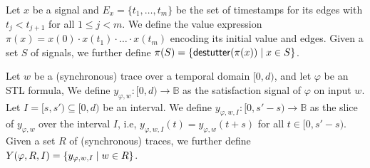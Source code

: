 \documentclass[iicol,lineno]{sn-jnl}
\newcommand{\destutter}{\mathsf{destutter}}
\newcommand{\B}{\mathbb{B}}
\newcommand{\?}{\text{?}}
\newcommand{\suchthat}{\;\ifnum\currentgrouptype=16 \middle\fi|\;}
\let\st\suchthat
\begin{document}
	Let $x$ be a signal and $E_x = \{t_1, \ldots, t_m\}$ be the set of timestamps for its edges with $t_j < t_{j+1}$ for all $1 \leq j < m$.
	We define the value expression $\pi(x) = x(0) \cdot x(t_1) \cdot \ldots \cdot x(t_m)$ encoding its initial value and edges.
	Given a set $S$ of signals, we further define $\pi(S) = \{ \destutter(\pi(x)) \st x \in S \}$.
	
	Let $w$ be a (synchronous) trace over a temporal domain $[0,d)$, and let $\varphi$ be an STL formula,
	We define $y_{\varphi,w} : [0,d) \to \B$ as the satisfaction signal of $\varphi$ on input $w$.
	Let $I = [s, s') \subseteq [0,d)$ be an interval.
	We define $y_{\varphi,w,I} : [0, s' - s) \to \B$ as the slice of $y_{\varphi,w}$ over the interval $I$, i.e, $y_{\varphi,w,I}(t) = y_{\varphi,w}(t + s)$ for all $t \in [0, s' - s)$.
	Given a set  $R$ of (synchronous) traces, we further define $Y(\varphi, R, I) = \{ y_{\varphi,w,I} \st w \in R \}$.
	
\end{document}
